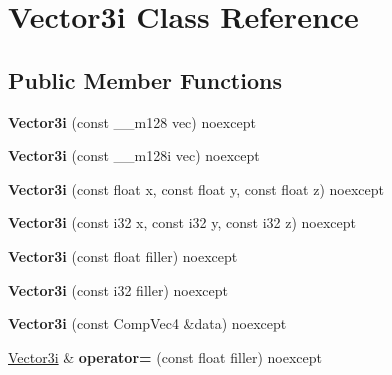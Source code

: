 \hypertarget{class_vector3i}{}\section{Vector3i Class Reference}
\label{class_vector3i}
\subsection*{Public Member Functions}
\begin{DoxyCompactItemize}
\item 
\mbox{\label{class_vector3i_a6f71559a7dbbb35f86600067eecfc5f3}} 
{\bfseries Vector3i} (const \+\_\+\+\_\+m128 vec) noexcept
\item 
\mbox{\label{class_vector3i_a36784de68b048cdd7fb77b5d805f3d20}} 
{\bfseries Vector3i} (const \+\_\+\+\_\+m128i vec) noexcept
\item 
\mbox{\label{class_vector3i_a8bec55b58926bdeab4ffb2e531bc81f6}} 
{\bfseries Vector3i} (const float x, const float y, const float z) noexcept
\item 
\mbox{\label{class_vector3i_a8636644f367b9abdaf51ef62d46c1afc}} 
{\bfseries Vector3i} (const i32 x, const i32 y, const i32 z) noexcept
\item 
\mbox{\label{class_vector3i_a12b6865ddaecb29b6614ac46d66b6596}} 
{\bfseries Vector3i} (const float filler) noexcept
\item 
\mbox{\label{class_vector3i_aaa914a33dc10a8e43baa7a9abf85d019}} 
{\bfseries Vector3i} (const i32 filler) noexcept
\item 
\mbox{\label{class_vector3i_a7bc7804edc326bddd6809633bf8a38a7}} 
{\bfseries Vector3i} (const Comp\+Vec4 \&data) noexcept
\item 
\mbox{\label{class_vector3i_ada108ce6d6df13efa03a5a34b52cd0c0}} 
\mbox{\hyperlink{class_vector3i}{Vector3i}} \& {\bfseries operator=} (const float filler) noexcept
\item 
\mbox{\label{class_vector3i_a8d96475c2c165d7bee9707f9e5ff8dff}} 

\end{DoxyCompactItemize}
